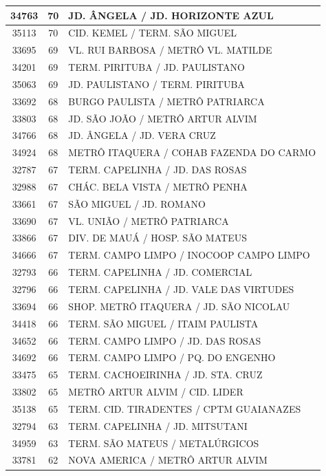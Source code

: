 \documentclass[
	12pt,				%
	oneside,			%
	a4paper,			%
	english,			%
	brazil				%
	]{abntex2ppgsi}
\begin{document}
{{{\begin{apendicesenv}
\begin{longtable}{c|c|p{7cm}}
 \hline 
34763 &	70 &	JD. ÂNGELA / JD. HORIZONTE AZUL \\ 
 \hline 
35113 &	70 &	CID. KEMEL / TERM. SÃO MIGUEL \\ 
 \hline 
33695 &	69 &	VL. RUI BARBOSA / METRÔ VL. MATILDE \\ 
 \hline 
34201 &	69 &	TERM. PIRITUBA / JD. PAULISTANO \\ 
 \hline 
35063 &	69 &	JD. PAULISTANO / TERM. PIRITUBA \\ 
 \hline 
33692 &	68 &	BURGO PAULISTA / METRÔ PATRIARCA \\ 
 \hline 
33803 &	68 &	JD. SÃO JOÃO / METRÔ ARTUR ALVIM \\ 
 \hline 
34766 &	68 &	JD. ÂNGELA / JD. VERA CRUZ \\ 
 \hline 
34924 &	68 &	METRÔ ITAQUERA / COHAB FAZENDA DO CARMO \\ 
 \hline 
32787 &	67 &	TERM. CAPELINHA / JD. DAS ROSAS \\ 
 \hline 
32988 &	67 &	CHÁC. BELA VISTA / METRÔ PENHA \\ 
 \hline 
33661 &	67 &	SÃO MIGUEL / JD. ROMANO \\ 
 \hline 
33690 &	67 &	VL. UNIÃO / METRÔ PATRIARCA \\ 
 \hline 
33866 &	67 &	DIV. DE MAUÁ / HOSP. SÃO MATEUS \\ 
 \hline 
34666 &	67 &	TERM. CAMPO LIMPO / INOCOOP CAMPO LIMPO \\ 
 \hline 
32793 &	66 &	TERM. CAPELINHA / JD. COMERCIAL \\ 
 \hline 
32796 &	66 &	TERM. CAPELINHA / JD. VALE DAS VIRTUDES \\ 
 \hline 
33694 &	66 &	SHOP. METRÔ ITAQUERA / JD. SÃO NICOLAU \\ 
 \hline 
34418 &	66 &	TERM. SÃO MIGUEL / ITAIM PAULISTA \\ 
 \hline 
34652 &	66 &	TERM. CAMPO LIMPO / JD. DAS ROSAS \\ 
 \hline 
34692 &	66 &	TERM. CAMPO LIMPO / PQ. DO ENGENHO \\ 
 \hline 
33475 &	65 &	TERM. CACHOEIRINHA / JD. STA. CRUZ \\ 
 \hline 
33802 &	65 &	METRÔ ARTUR ALVIM / CID. LIDER \\ 
 \hline 
35138 &	65 &	TERM. CID. TIRADENTES / CPTM GUAIANAZES \\ 
 \hline 
32794 &	63 &	TERM. CAPELINHA / JD. MITSUTANI \\ 
 \hline 
34959 &	63 &	TERM. SÃO MATEUS / METALÚRGICOS \\ 
 \hline 
33781 &	62 &	NOVA AMERICA / METRÔ ARTUR ALVIM \\ 

\end{longtable}
\end{apendicesenv}}}}
\end{document}
